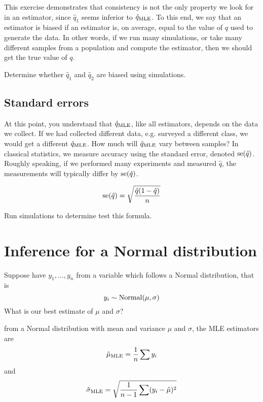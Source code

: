 This exercise demonstrates that consistency is not the only property we look for in an estimator, since $\hat{q}_1$ seems inferior to $\hat{q}_{\rm MLE}$. To this end, we say that an estimator is biased if an estimator is, on average, equal to the value of $q$ used to generate the data. In other words, if we run many simulations, or take many different samples from a population and compute the estimator, then we should get the true value of $q$. 

\begin{exercise}
Determine whether $\hat{q}_1$ and $\hat{q}_2$ are biased using simulations.  
\end{exercise} 


\subsection{Standard errors}
At this point, you understand that $\hat{q}_{\rm MLE}$, like all estimators, depends on the data we collect. If we had collected different data, e.g. surveyed a different class, we would get a different $\hat{q}_{\rm MLE}$. How much will $\hat{q}_{\rm MLE}$ vary between samples? In classical statistics, we measure accuracy using the standard error, denoted ${\rm se}(\hat{q})$.  Roughly speaking, if we performed many experiments and measured $\hat{q}$, the measurements will typically differ by ${\rm se}(\hat{q})$.

\begin{equation}
{\rm se}(\hat{q}) = \sqrt{\frac{\hat{q}(1-\hat{q})}{n}}
\end{equation}

\begin{example}
Run simulations to determine test this formula. 
\end{example} 





\section{Inference for a Normal distribution}

Suppose have $y_1,\dots,y_n$ from a variable which follows a Normal distribution, that is 
\begin{equation}
y_i \sim {\rm Normal}(\mu,\sigma)
\end{equation}
What is our best estimate of $\mu$ and $\sigma$? 

from a Normal distribution with mean and variance $\mu$ and $\sigma$, the MLE estimators are 
\begin{equation}
\hat{\mu}_{\rm MLE} = \frac{1}{n}\sum y_i
\end{equation}
and 
\begin{equation}
\hat{\sigma}_{\rm MLE} = \sqrt{\frac{1}{n-1}\sum ( y_i - \hat{\mu})^2}
\end{equation}



